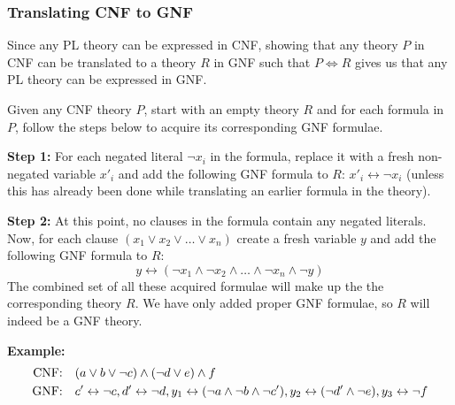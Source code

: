 \subsubsection{Translating CNF to GNF}
\label{subs:Translating CNF to GNF}
Since any PL theory can be expressed in CNF, showing that any theory $P$ in CNF can be translated to a theory $R$ in GNF such that $P \Leftrightarrow R$ gives us that any PL theory can be expressed in GNF.

Given any CNF theory $P$, start with an empty theory $R$ and for each formula in $P$, follow the steps below to acquire its corresponding GNF formulae.

\textbf{Step 1:}
For each negated literal $\neg x_i$ in the formula, replace it with a fresh non-negated variable $x'_i$ and add the following GNF formula to $R$: $x'_i \leftrightarrow \neg x_i$ (unless this has already been done while translating an earlier formula in the theory).

\textbf{Step 2:}
At this point, no clauses in the formula contain any negated literals.  Now, for each clause $(x_1 \vee x_2 \vee \dots \vee x_n)$ create a fresh variable $y$ and add the following GNF formula to $R$: \[y \leftrightarrow (\neg x_1 \wedge \neg x_2 \wedge \dots \wedge \neg x_n \wedge \neg y)\]
The combined set of all these acquired formulae will make up the the corresponding theory $R$.  We have only added proper GNF formulae, so $R$ will indeed be a GNF theory.

\textbf{Example: }
\begin{align}
  \text{CNF:\quad}& (a \vee b \vee \neg c) \wedge (\neg d \vee e) \wedge f\\
  \text{GNF:\quad}& c' \leftrightarrow \neg c, d' \leftrightarrow \neg d, y_1 \leftrightarrow (\neg a \wedge \neg b \wedge \neg c'), y_2 \leftrightarrow (\neg d' \wedge \neg e), y_3 \leftrightarrow \neg f
\end{align}
